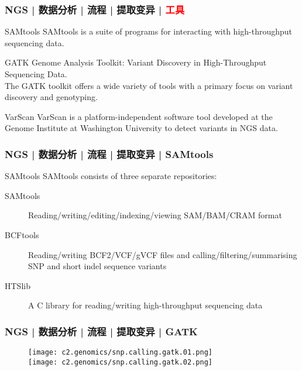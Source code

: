 \begin{frame}
  \frametitle{NGS | 数据分析 | 流程 | 提取变异 | \textcolor{red}{工具}}
  \begin{block}{SAMtools}
    SAMtools is a suite of programs for interacting with high-throughput sequencing data.
  \end{block}
  \pause
  \begin{block}{GATK}
    Genome Analysis Toolkit: Variant Discovery in High-Throughput Sequencing Data.\\
    The GATK toolkit offers a wide variety of tools with a primary focus on variant discovery and genotyping.
  \end{block}
  \pause
  \begin{block}{VarScan}
    VarScan is a platform-independent software tool developed at the Genome Institute at Washington University to detect variants in NGS data.
  \end{block}
\end{frame}

\begin{frame}
  \frametitle{NGS | 数据分析 | 流程 | 提取变异 | SAMtools}
  \begin{block}{SAMtools}
    SAMtools consists of three separate repositories:
    \begin{description}
      \item[SAMtools] Reading/writing/editing/indexing/viewing SAM/BAM/CRAM format
      \item[BCFtools] Reading/writing BCF2/VCF/gVCF files and calling/filtering/summarising SNP and short indel sequence variants
      \item[HTSlib] A C library for reading/writing high-throughput sequencing data
    \end{description}
  \end{block}
\end{frame}

\begin{frame}
  \frametitle{NGS | 数据分析 | 流程 | 提取变异 | GATK}
  \begin{figure}
    \centering
    \texttt{[image: c2.genomics/snp.calling.gatk.01.png]}\\
    \vspace{1em}
    \texttt{[image: c2.genomics/snp.calling.gatk.02.png]}
  \end{figure}
\end{frame}

